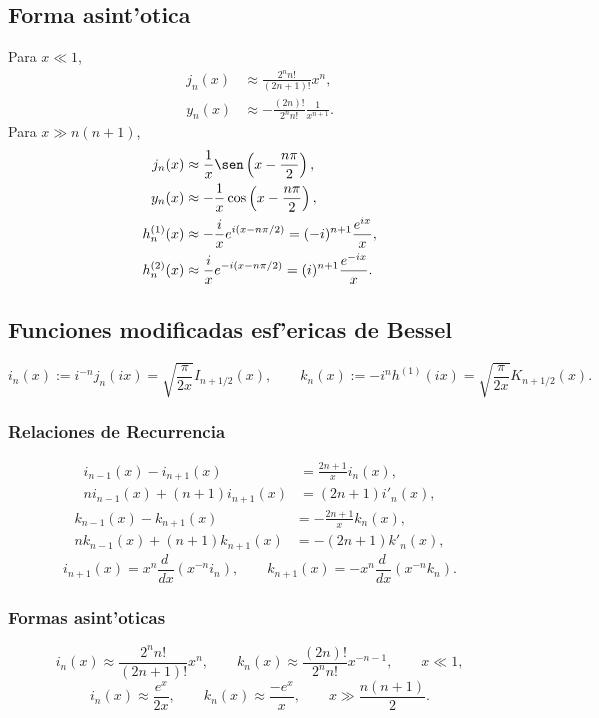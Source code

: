 \subsection{Forma asint'otica}
Para $x\ll 1$,
\begin{align}
j_n(x) &\approx \frac{2^nn!}{(2n+1)!}x^n, \\
y_n(x) &\approx -\frac{(2n)!}{2^nn!}\frac{1}{x^{n+1}}.
\end{align}
Para $x\gg n(n+1)$,
\begin{align}
j_n(x) &\approx \frac{1}{x}\sen\left(x-\frac{n\pi}{2}\right), \\
y_n(x) &\approx -\frac{1}{x}\cos\left(x-\frac{n\pi}{2}\right), \\
h^{(1)}_n(x) &\approx -\frac{i}{x}e^{i(x-{n\pi}/{2})}=(-i)^{n+1}\frac{e^{ix}}{x}, \\
h^{(2)}_n(x) &\approx \frac{i}{x}e^{-i(x-{n\pi}/{2})}=(i)^{n+1}\frac{e^{-ix}}{x}.
\end{align}

\subsection{Funciones modificadas esf'ericas de Bessel}
\begin{equation}
i_n(x):=i^{-n}j_n(ix)=\sqrt{\frac{\pi}{2x}}I_{n+1/2}(x), \qquad 
k_n(x):=-i^{n}h^{(1)}(ix)=\sqrt{\frac{\pi}{2x}}K_{n+1/2}(x).
\end{equation}

\subsubsection{Relaciones de Recurrencia}
\begin{align}
i_{n-1}(x)-i_{n+1}(x) &= \frac{2n+1}{x}i_n(x),  \\
ni_{n-1}(x)+(n+1)i_{n+1}(x) &= (2n+1)i'_n(x),
\end{align}
\begin{align}
k_{n-1}(x)-k_{n+1}(x) &= -\frac{2n+1}{x}k_n(x),\\
nk_{n-1}(x)+(n+1)k_{n+1}(x) &= -(2n+1)k'_n(x),
\end{align}
\begin{equation}
i_{n+1}(x)=x^n\frac{d\ }{dx}(x^{-n}i_n), \qquad k_{n+1}(x)=-x^n\frac{d\ }{dx}(x^{-n}k_n).
\end{equation}


\subsubsection{Formas asint'oticas}
\begin{equation}
i_n(x)\approx\frac{2^nn!}{(2n+1)!}x^n, \qquad k_n(x)\approx\frac{(2n)!}{2^nn!}x^{-n-1}, \qquad x\ll 1,
\end{equation}
\begin{equation}
i_n(x)\approx \frac{e^x}{2x}, \qquad k_n(x)\approx \frac{-e^x}{x}, \qquad x\gg \frac{n(n+1)}{2}.
\end{equation}


